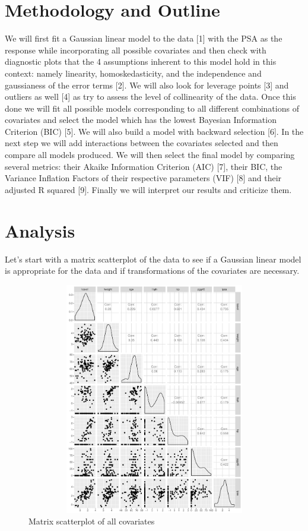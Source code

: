 \documentclass[10pt]{article}
\begin{document}
\section{Methodology and Outline}
\quad  We will first fit a Gaussian linear model to the data [1] with the PSA as the response while incorporating all possible covariates and then check with diagnostic plots that the 4 assumptions inherent to this model hold in this context: namely linearity, homoskedasticity, and the independence and gaussianess of the error terms [2]. We will also look for leverage points [3] and outliers as well [4] as try to assess the level of collinearity of the data. Once this done we will fit all possible models corresponding to all different combinations of covariates and select the model which has the lowest Bayesian Information Criterion (BIC) [5]. We will also build a model with backward selection [6]. In the next step we will add interactions between the covariates selected and then compare all models produced. We will then select the final model by comparing several metrics: their Akaike Information Criterion (AIC) [7], their BIC, the Variance Inflation Factors of their respective parameters (VIF) [8] and their adjusted R squared [9]. Finally we will interpret our results and criticize them.

\section{Analysis}
\quad Let's start with a matrix scatterplot of the data to see if a Gaussian linear model is appropriate for the data and if transformations of the covariates are necessary. 

\begin{figure}[htb]
\begin{center}
\includegraphics[height=4in,width=5in]{matrixscatterplot.pdf}
\caption{Matrix scatterplot of all covariates}
\end{center}
\end{figure}
\end{document}

